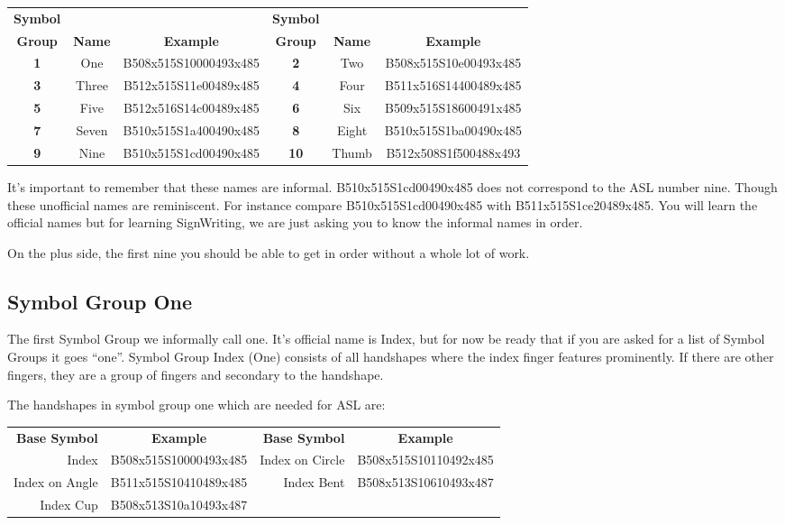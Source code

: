 \documentclass{article}
\begin{document}
\begin{center}
\begin{tabular}{ccc@{\hskip 5mm}ccc}
\textbf{Symbol}&&&\textbf{Symbol}\\
\textbf{Group}&\textbf{Name}&\textbf{Example}&\textbf{Group}&\textbf{Name}&\textbf{Example}\\
\textbf{1}&One  &B508x515S10000493x485&\textbf{2} &Two  &B508x515S10e00493x485\\
\textbf{3}&Three&B512x515S11e00489x485&\textbf{4} &Four &B511x516S14400489x485\\
\textbf{5}&Five &B512x516S14c00489x485&\textbf{6} &Six  &B509x515S18600491x485\\
\textbf{7}&Seven&B510x515S1a400490x485&\textbf{8} &Eight&B510x515S1ba00490x485\\
\textbf{9}&Nine &B510x515S1cd00490x485&\textbf{10}&Thumb&B512x508S1f500488x493\\
\end{tabular}
\end{center}

It's important to remember that these names are informal.
B510x515S1cd00490x485 does not correspond to the ASL number nine.
Though these unofficial names are reminiscent.
For instance compare B510x515S1cd00490x485 with B511x515S1ce20489x485.
You will learn the official names but for learning SignWriting, we are just asking you to know the informal names in order.

On the plus side, the first nine you should be able to get in order without a whole lot of work.

\subsection{Symbol Group One}

The first Symbol Group we informally call one.
It's official name is Index, but for now be ready that if you are asked for a list of Symbol Groups it goes ``one''.
Symbol Group Index (One) consists of all handshapes where the index finger features prominently.
If there are other fingers, they are a group of fingers and secondary to the handshape.

The handshapes in symbol group one which are needed for ASL are:

\begin{center}
\begin{tabular}{rcrc}
\textbf{Base Symbol}&\textbf{Example}&\textbf{Base Symbol}&\textbf{Example}\\
Index         &B508x515S10000493x485&Index on Circle&B508x515S10110492x485\\
Index on Angle&B511x515S10410489x485&Index Bent     &B508x513S10610493x487\\
Index Cup     &B508x513S10a10493x487\\
\end{tabular}
\end{center}
\end{document}
